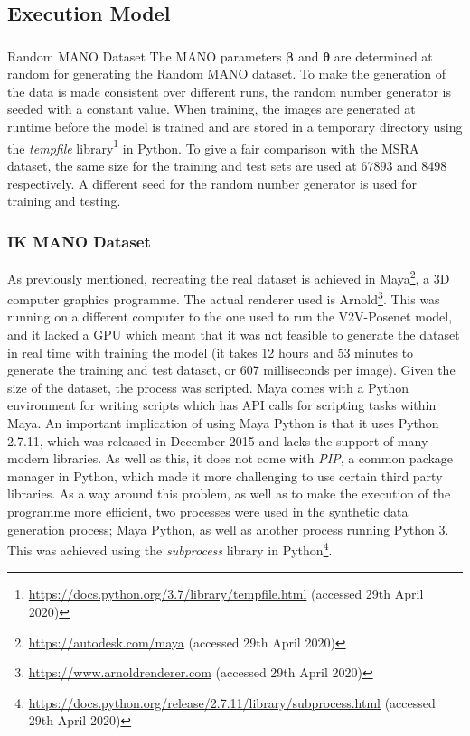 \subsection{Execution Model}
\subsubsection{}{Random MANO Dataset}
The MANO parameters $\bm{\beta}$ and $\bm{\theta}$ are determined at random for generating the Random MANO dataset. To make the generation of the data is made consistent over different runs, the random number generator is seeded with a constant value. When training, the images are generated at runtime before the model is trained and are stored in a temporary directory using the {\slshape tempfile} library\footnote{\url{https://docs.python.org/3.7/library/tempfile.html} (accessed 29th April 2020)} in Python. To give a fair comparison with the MSRA dataset, the same size for the training and test sets are used at 67893 and 8498 respectively. A different seed for the random number generator is used for training and testing. 

\subsubsection{IK MANO Dataset}
As previously mentioned, recreating the real dataset is achieved in Maya\footnote{\url{https://autodesk.com/maya} (accessed 29th April 2020)}, a 3D computer graphics programme. The actual renderer used is Arnold\footnote{\url{https://www.arnoldrenderer.com} (accessed 29th April 2020)}. This was running on a different computer to the one used to run the V2V-Posenet model, and it lacked a GPU which meant that it was not feasible to generate the dataset in real time with training the model (it takes 12 hours and 53 minutes to generate the training and test dataset, or 607 milliseconds per image). Given the size of the dataset, the process was scripted. Maya comes with a Python environment for writing scripts which has API calls for scripting tasks within Maya. An important implication of using Maya Python is that it uses Python 2.7.11, which was released in December 2015 and lacks the support of many modern libraries. As well as this, it does not come with {\slshape PIP}, a common package manager in Python, which made it more challenging to use certain third party libraries. As a way around this problem, as well as to make the execution of the programme more efficient, two processes were used in the synthetic data generation process; Maya Python, as well as another process running Python 3. This was achieved using the {\slshape subprocess} library in Python\footnote{\url{https://docs.python.org/release/2.7.11/library/subprocess.html} (accessed 29th April 2020)}.

